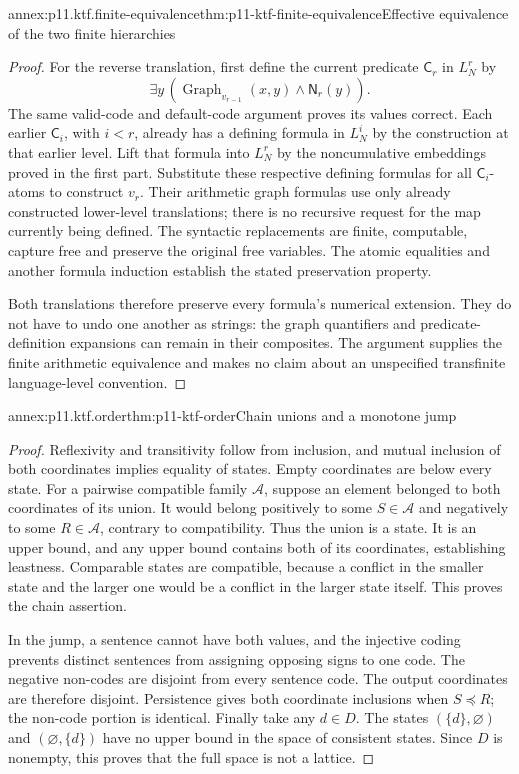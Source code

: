 \begin{annexitem}{annex:p11.ktf.finite-equivalence}{thm:p11-ktf-finite-equivalence}{Effective equivalence of the two finite hierarchies}
\begin{proof}
For the reverse translation, first define the current predicate
\(\mathsf C_r\) in \(L_N^r\) by
\[
 \exists y\,(\operatorname{Graph}_{v_{r-1}}(x,y)
                                      \land\mathsf N_r(y)).
\]
The same valid-code and default-code argument proves its values correct.
Each earlier \(\mathsf C_i\), with \(i<r\), already has a defining
formula in \(L_N^i\) by the construction at that earlier level.
Lift that formula into \(L_N^r\) by the noncumulative embeddings
proved in the first part. Substitute these respective defining formulas
for all \(\mathsf C_i\)-atoms to construct \(v_r\). Their arithmetic
graph formulas use only already constructed lower-level translations;
there is no recursive request for the map currently being defined.
The syntactic replacements are finite, computable, capture free and
preserve the original free variables. The atomic equalities and another
formula induction establish the stated preservation property.

Both translations therefore preserve every formula's numerical extension.
They do not have to undo one another as strings: the graph quantifiers
and predicate-definition expansions can remain in their composites.
The argument supplies the finite arithmetic equivalence and makes no
claim about an unspecified transfinite language-level convention.
\end{proof}
\end{annexitem}

\begin{annexitem}{annex:p11.ktf.order}{thm:p11-ktf-order}{Chain unions and a monotone jump}
\begin{proof}
Reflexivity and transitivity follow from inclusion, and mutual inclusion
of both coordinates implies equality of states. Empty coordinates are
below every state. For a pairwise compatible family \(\mathcal A\),
suppose an element belonged to both coordinates of its union. It would
belong positively to some \(S\in\mathcal A\) and negatively to some
\(R\in\mathcal A\), contrary to compatibility. Thus the union is
a state. It is an upper bound, and any upper bound contains both of its
coordinates, establishing leastness. Comparable states are compatible,
because a conflict in the smaller state and the larger one would be a
conflict in the larger state itself. This proves the chain assertion.

In the jump, a sentence cannot have both values, and the injective coding
prevents distinct sentences from assigning opposing signs to one code.
The negative non-codes are disjoint from every sentence code. The output
coordinates are therefore disjoint. Persistence gives both coordinate
inclusions when \(S\preceq R\); the non-code portion is identical.
Finally take any \(d\in D\). The states \((\{d\},\varnothing)\)
and \((\varnothing,\{d\})\) have no upper bound in the space of
consistent states. Since \(D\) is nonempty, this proves that the full
space is not a lattice.
\end{proof}
\end{annexitem}

